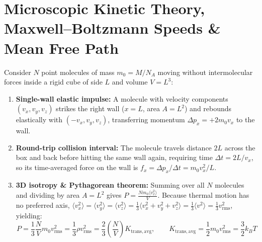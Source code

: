 \section{Microscopic Kinetic Theory, Maxwell--Boltzmann Speeds \& Mean Free Path}\label{sec:06.4}

\begin{derivation}
Consider $N$ point molecules of mass $m_0 = M/N_A$ moving without intermolecular forces inside a rigid cube of side $L$ and volume $V = L^3$:
\begin{enumerate}
  \item \textbf{Single-wall elastic impulse:} A molecule with velocity components $(v_x, v_y, v_z)$ strikes the right wall ($x = L$, area $A = L^2$) and rebounds elastically with $(-v_x, v_y, v_z)$, transferring momentum $\Delta p_x = +2m_0 v_x$ to the wall.
  \item \textbf{Round-trip collision interval:} The molecule travels distance $2L$ across the box and back before hitting the same wall again, requiring time $\Delta t = 2L/v_x$, so its time-averaged force on the wall is $f_x = \Delta p_x / \Delta t = m_0 v_x^2 / L$.
  \item \textbf{3D isotropy \& Pythagorean theorem:} Summing over all $N$ molecules and dividing by area $A = L^2$ gives $P = \frac{N m_0 \langle v_x^2\rangle}{V}$. Because thermal motion has no preferred axis, $\langle v_x^2\rangle = \langle v_y^2\rangle = \langle v_z^2\rangle = \frac{1}{3}\langle v_x^2 + v_y^2 + v_z^2\rangle = \frac{1}{3}\langle v^2\rangle = \frac{1}{3}v_{\mathrm{rms}}^2$, yielding:
  \begin{equation}\label{eq:06:kinetic-p}
    \boxed{P = \frac{1}{3}\frac{N}{V}m_0 v_{\mathrm{rms}}^2 = \frac{1}{3}\rho v_{\mathrm{rms}}^2 = \frac{2}{3}\left(\frac{N}{V}\right)K_{\mathrm{trans,avg}}}, \qquad \boxed{K_{\mathrm{trans,avg}} = \frac{1}{2}m_0 v_{\mathrm{rms}}^2 = \frac{3}{2}k_B T}
  \end{equation}
\end{enumerate}
\end{derivation}

